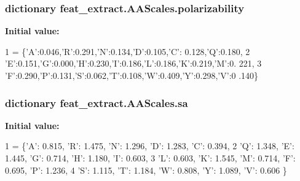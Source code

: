 \subsubsection[{polarizability}]{\setlength{\rightskip}{0pt plus 5cm}dictionary feat\+\_\+extract.\+A\+A\+Scales.\+polarizability}\label{namespacefeat__extract_1_1_a_a_scales_ae880e24690afc4f1d81df451fd6a894e}
{\bfseries Initial value\+:}
\begin{DoxyCode}
1 = \{\textcolor{stringliteral}{'A'}:0.046,\textcolor{stringliteral}{'}\textcolor{stringliteral}{R':0.291,'}N':0.134,'D':0.105,'C': 0.128,'Q':0.180,
2                                          \textcolor{stringliteral}{'E'}:0.151,\textcolor{stringliteral}{'G'}:0.000,\textcolor{stringliteral}{'H'}:0.230,\textcolor{stringliteral}{'I'}:0.186,\textcolor{stringliteral}{'L'}:0.186,\textcolor{stringliteral}{'K'}:0.219,\textcolor{stringliteral}{'M'}:0.
      221,
3                                           \textcolor{stringliteral}{'F'}:0.290,\textcolor{stringliteral}{'P'}:0.131,\textcolor{stringliteral}{'S'}:0.062,\textcolor{stringliteral}{'T'}:0.108,\textcolor{stringliteral}{'W'}:0.409,\textcolor{stringliteral}{'Y'}:0.298,\textcolor{stringliteral}{'V'}:0
      .140\}
\end{DoxyCode}
\hypertarget{namespacefeat__extract_1_1_a_a_scales_afd590874a9fe813137b70358549843de}{}
\subsubsection[{sa}]{\setlength{\rightskip}{0pt plus 5cm}dictionary feat\+\_\+extract.\+A\+A\+Scales.\+sa}\label{namespacefeat__extract_1_1_a_a_scales_afd590874a9fe813137b70358549843de}
{\bfseries Initial value\+:}
\begin{DoxyCode}
1 = \{\textcolor{stringliteral}{'A'}: 0.815, \textcolor{stringliteral}{'}\textcolor{stringliteral}{R': 1.475, '}N': 1.296, 'D': 1.283, 'C': 0.394,
2       \textcolor{stringliteral}{'Q'}: 1.348, \textcolor{stringliteral}{'E'}: 1.445, \textcolor{stringliteral}{'G'}: 0.714, \textcolor{stringliteral}{'H'}: 1.180, \textcolor{stringliteral}{'I'}: 0.603,
3       \textcolor{stringliteral}{'L'}: 0.603, \textcolor{stringliteral}{'K'}: 1.545, \textcolor{stringliteral}{'M'}: 0.714, \textcolor{stringliteral}{'F'}: 0.695, \textcolor{stringliteral}{'P'}: 1.236,
4       \textcolor{stringliteral}{'S'}: 1.115, \textcolor{stringliteral}{'T'}: 1.184, \textcolor{stringliteral}{'W'}: 0.808, \textcolor{stringliteral}{'Y'}: 1.089, \textcolor{stringliteral}{'V'}: 0.606 \}
\end{DoxyCode}
\hypertarget{namespacefeat__extract_1_1_a_a_scales_aab8e344910bd82fbce1a3a951aaecc39}{}
